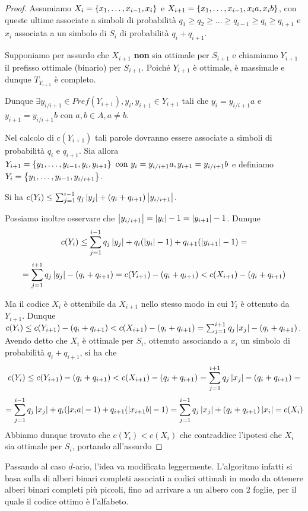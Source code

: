 \begin{proof}
  Assumiamo \(X_i = \set{x_1, \ldots,x_{i-1},x_i}\) e \(X_{i+1} = \set{x_1,\ldots,x_{i-1},x_{i}a, x_{i}b}\), con queste ultime associate a simboli di probabilità \(q_1\geq q_2 \geq \ldots \geq q_{i-1} \geq q_i \geq q_{i+1}\) e \(x_i\) associata a un simbolo di \(S_i\) di probabilità \(q_i + q_{i+1}\).
  
  Supponiamo per assurdo che \(X_{i+1}\) \textbf{non} sia ottimale per \(S_{i+1}\) e chiamiamo \(Y_{i+1} \) il prefisso ottimale (binario) per \(S_{i+1}\).
  Poiché \(Y_{i+1}\) è ottimale, è massimale e dunque \(T_{Y_{i+1}}\) è completo.

  Dunque \(\exists y_{i/i+1} \in Pref(Y_{i+1}),y_i, y_{i+1} \in Y_{i+1}\) tali che \(y_i = y_{i/i+1}a\) e \(y_{i+1} = y_{i/i+1}b\) con \(a,b \in A, a \neq b\).

  Nel calcolo di \(c(Y_{i+1})\) tali parole dovranno essere associate a simboli di probabilità \(q_i\) e \(q_{i+1}\).
  Sia allora \(Y_{i+1} = \set{y_1,\ldots,y_{i-1},y_i,y_{i+1}} \text{ con } y_i=y_{i/i+1}a,y_{i+1} = y_{i/i+1}b\) e definiamo \(Y_i = \set{y_1,\ldots,y_{i-1}, y_{i/i+1}}\).

  Si ha \(c(Y_i) \leq \sum_{j=1}^{i-1} q_j\left|y_j\right| + (q_i+q_{i+1})\left|y_{i/i+1}\right|\).

  Possiamo inoltre osservare che \(\left|y_{i/i+1}\right| = \left|y_{i}\right|-1 = \left|y_{i+1}\right|-1\).
  Dunque
  \[c(Y_i) \leq \sum_{j=1}^{i-1} q_j\left|y_j\right| + q_i(\left|y_{i}\right|-1) + q_{i+1}(\left|y_{i+1}\right|-1) = \]
  \[=\sum_{j=1}^{i+1} q_j\left|y_j\right| - (q_i + q_{i+1}) = c(Y_{i+1}) - (q_i + q_{i+1}) < c(X_{i+1}) - (q_i + q_{i+1})\]

  Ma il codice \(X_i\) è ottenibile da \(X_{i+1}\) nello stesso modo in cui \(Y_i\) è ottenuto da \(Y_{i+1}\).
  Dunque \(c(Y_i) \leq c(Y_{i+1}) - (q_i + q_{i+1}) < c(X_{i+1}) - (q_i + q_{i+1}) = \sum_{j=1}^{i+1} q_j\left|x_j\right| - (q_i + q_{i+1})\).
  Avendo detto che \(X_i\) è ottimale per \(S_i\),  ottenuto associando a \(x_i\) un simbolo di probabilità \(q_i + q_{i+1}\), si ha che
  \[c(Y_i) \leq c(Y_{i+1}) - (q_i + q_{i+1}) < c(X_{i+1}) - (q_i + q_{i+1}) = \sum_{j=1}^{i+1} q_j\left|x_j\right| - (q_i + q_{i+1}) = \]
  \[=\sum_{j=1}^{i-1} q_j\left|x_j\right| + q_i(\left|x_i a\right|-1) + q_{i+1}(\left|x_{i+1}b\right|-1) = \sum_{j=1}^{i-1} q_j\left|x_j\right| + (q_i+q_{i+1})\left|x_{i}\right| = c(X_i)\]
  Abbiamo dunque trovato che \(c(Y_i)<c(X_i)\) che contraddice l'ipotesi che \(X_i\) sia ottimale per \(S_i\), portando all'assurdo
\end{proof}


Passando al caso \(d\)-ario, l'idea va modificata leggermente.
L'algoritmo infatti si basa sulla  di alberi binari completi associati a codici ottimali in modo da ottenere alberi binari completi più piccoli, fino ad arrivare a un albero con \(2\) foglie, per il quale il codice ottimo è l'alfabeto. 

